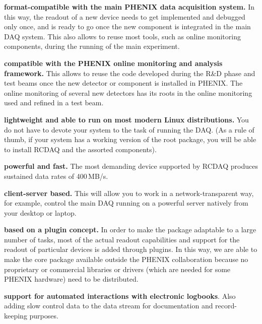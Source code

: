 \documentclass{article}[11pt]
\begin{document}
\begin{description}

\item {\bf format-compatible with the main PHENIX data acquisition
  system.} In this way, the readout of a new device needs to get
  implemented and debugged only once, and is ready to go once the new
  component is integrated in the main DAQ system. This also allows to
  reuse most tools, such as online monitoring components, during the
  running of the main experiment.

\item {\bf compatible with the PHENIX online monitoring and analysis
  framework.}  This allows to reuse the code developed during the R\&D
  phase and test beams once the new detector or component is installed
  in PHENIX. The online monitoring of several new detectors has its
  roots in the online monitoring used and refined in a test beam.

\item {\bf lightweight and able to run on most modern Linux distributions.}
  You do not have to devote your system to the task of running the
  DAQ. (As a rule of thumb, if your system has a working version of the 
  root package, you will be able to install RCDAQ and the assorted
  components). 

\item {\bf powerful and fast.} The most demanding device supported by
  RCDAQ produces sustained data rates of 400\,MB/s.

\item {\bf client-server based.} This will allow you to work in a
  network-transparent way, for example, control the main DAQ running on
  a powerful server natively from your desktop or laptop.

\item {\bf based on a plugin concept.} In order to make the package
  adaptable to a large number of tasks, most of the actual readout
  capabilities and support for the readout of particular devices is
  added through plugins. In this way, we are able to make the core
  package available outside the PHENIX collaboration because no
  proprietary or commercial libraries or drivers (which are needed for
  some PHENIX hardware) need to be distributed.

\item {\bf support for automated interactions with electronic
  logbooks}.  Also adding slow control data to the data stream for
  documentation and record-keeping purposes.


\end{description}
\end{document}
